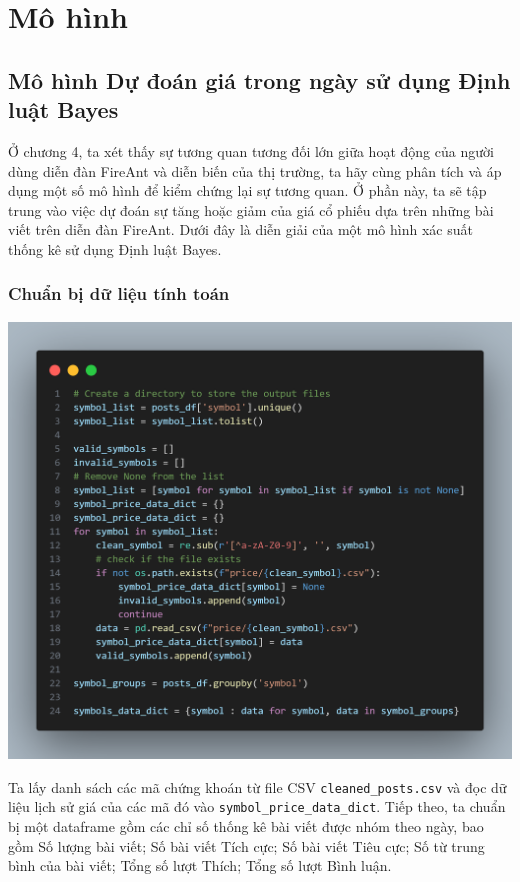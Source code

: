 \chapter{Mô hình}

\section{Mô hình Dự đoán giá trong ngày sử dụng Định luật Bayes}
Ở chương 4, ta xét thấy sự tương quan tương đối lớn giữa hoạt động của người dùng diễn đàn FireAnt và diễn biến của thị trường, ta hãy cùng phân tích và áp dụng một số mô hình để kiểm chứng lại sự tương quan. Ở phần này, ta sẽ tập trung vào việc dự đoán sự tăng hoặc giảm của giá cổ phiếu dựa trên những bài viết trên diễn đàn FireAnt. Dưới đây là diễn giải của một mô hình xác suất thống kê sử dụng Định luật Bayes.

\subsection{Chuẩn bị dữ liệu tính toán}
 
\begin{center}
\includegraphics[width=0.75\linewidth]{images/code-5.1.png}
\end{center}

Ta lấy danh sách các mã chứng khoán từ file CSV \texttt{cleaned\_posts.csv} và đọc dữ liệu lịch sử giá của các mã đó vào \texttt{symbol\_price\_data\_dict}. Tiếp theo, ta chuẩn bị một dataframe gồm các chỉ số thống kê bài viết được nhóm theo ngày, bao gồm Số lượng bài viết; Số bài viết Tích cực; Số bài viết Tiêu cực; Số từ trung bình của bài viết; Tổng số lượt Thích; Tổng số lượt Bình luận.\\

